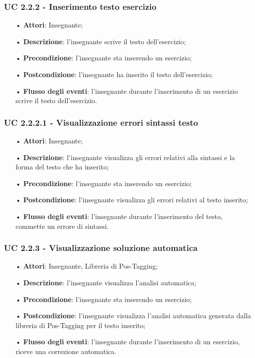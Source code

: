 \subsubsection{UC 2.2.2 - Inserimento testo esercizio}
\begin{itemize}
	\item[•] \textbf{Attori}: Insegnante;
	\item[•] \textbf{Descrizione}: l'insegnante scrive il testo dell'esercizio;
	\item[•] \textbf{Precondizione}: l'insegnante sta inserendo un esercizio;
	\item[•] \textbf{Postcondizione}: l'insegnante ha inserito il testo dell'esercizio;
	\item[•] \textbf{Flusso degli eventi}: l'insegnante durante l'inserimento di un esercizio scrive il testo dell'esercizio.
\end{itemize}

\subsubsection{UC 2.2.2.1 - Visualizzazione errori sintassi testo}
\begin{itemize}
	\item[•] \textbf{Attori}: Insegnante;
	\item[•] \textbf{Descrizione}: l'insegnante visualizza gli errori relativi alla sintassi e la forma del testo che ha inserito;
	\item[•] \textbf{Precondizione}: l'insegnante sta inserendo un esercizio;
	\item[•] \textbf{Postcondizione}: l'insegnante visualizza gli errori relativi al testo inserito;
	\item[•] \textbf{Flusso degli eventi}: l'insegnante durante l'inserimento del testo, commette un errore di sintassi.
\end{itemize}

\subsubsection{UC 2.2.3 - Visualizzazione soluzione automatica} 
\begin{itemize}
	\item[•] \textbf{Attori}: Insegnante, Libreria di Pos-Tagging;
	\item[•] \textbf{Descrizione}: l'insegnante visualizza l'analisi automatica;
	\item[•] \textbf{Precondizione}: l'insegnante sta inserendo un esercizio;
	\item[•] \textbf{Postcondizione}: l'insegnante visualizza l'analisi automatica generata dalla libreria di Pos-Tagging per il testo inserito;
	\item[•] \textbf{Flusso degli eventi}: l'insegnante durante l'inserimento di un esercizio, riceve una correzione automatica.
\end{itemize}


